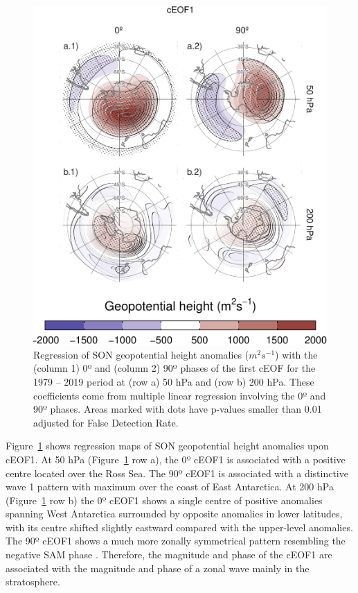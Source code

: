 \documentclass[pdflatex,lineno,sn-basic]{sn-jnl}
\theoremstyle{thmstyleone}%
\theoremstyle{thmstyletwo}%
\theoremstyle{thmstylethree}%
\begin{document}
\begin{figure}
\centering
\includegraphics{shceof_files/figure-latex/eof1-regr-gh-1.pdf}
\caption{\label{fig:eof1-regr-gh}Regression of SON geopotential height anomalies (\(m^2s^{-1}\)) with the (column 1) 0º and (column 2) 90º phases of the first cEOF for the 1979 -- 2019 period at (row a) 50 hPa and (row b) 200 hPa. These coefficients come from multiple linear regression involving the 0º and 90º phases. Areas marked with dots have p-values smaller than 0.01 adjusted for False Detection Rate.}
\end{figure}

Figure~\ref{fig:eof1-regr-gh} shows regression maps of SON geopotential height anomalies upon cEOF1.
At 50 hPa (Figure~\ref{fig:eof1-regr-gh} row a), the 0º cEOF1 is associated with a positive centre located over the Ross Sea.
The 90º cEOF1 is associated with a distinctive wave 1 pattern with maximum over the coast of East Antarctica.
At 200 hPa (Figure~\ref{fig:eof1-regr-gh} row b) the 0º cEOF1 shows a single centre of positive anomalies spanning West Antarctica surrounded by opposite anomalies in lower latitudes, with its centre shifted slightly eastward compared with the upper-level anomalies.
The 90º cEOF1 shows a much more zonally symmetrical pattern resembling the negative SAM phase \citep[e.g.][]{fogt2020}.
Therefore, the magnitude and phase of the cEOF1 are associated with the magnitude and phase of a zonal wave mainly in the stratosphere.
\end{document}

